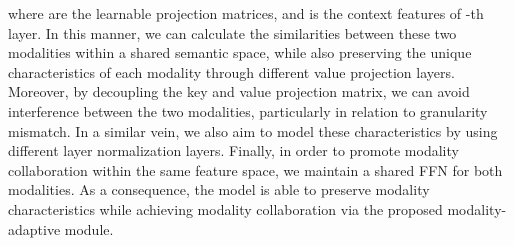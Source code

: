 \documentclass[10pt,twocolumn,letterpaper]{article}
\begin{document}
where  are the learnable projection matrices, and  is the context features of -th layer. In this manner, we can calculate the similarities between these two modalities within a shared semantic space, while also preserving the unique characteristics of each modality through different value projection layers. Moreover, by decoupling the key and value projection matrix, we can avoid interference between the two modalities, particularly in relation to granularity mismatch. In a similar vein, we also aim to model these characteristics by using different layer normalization layers. Finally, in order to promote modality collaboration within the same feature space, we maintain a shared FFN for both modalities. 
As a consequence, the model is able to preserve modality characteristics while achieving modality collaboration via the proposed modality-adaptive module.
\end{document}
